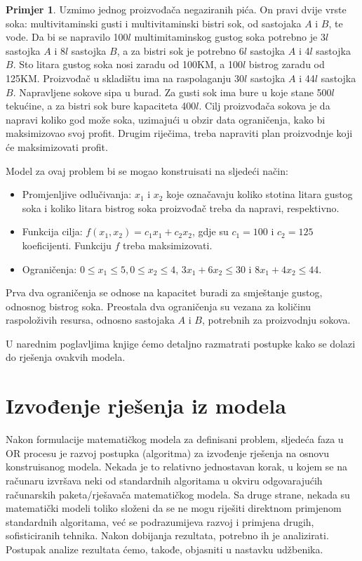 \documentclass[a4paper, utf8, 11pt, colorlinks]{book}
\theoremstyle{definition}
\newtheorem{primjer}{Primjer}[chapter]
\begin{document}
\begin{primjer}
Uzmimo jednog proizvođača negaziranih pića. On pravi dvije vrste soka: multivitaminski gusti i multivitaminski bistri sok, od sastojaka $A$ i $B$, te vode. Da bi se napravilo 100$l$ multimitaminskog gustog soka potrebno je 3$l$
sastojka $A$ i 8$l$ sastojka $B$, a za bistri sok je potrebno 6$l$ sastojka $A$ i 4$l$ sastojka $B$. Sto litara gustog soka nosi zaradu od 100KM, a 100$l$ bistrog zaradu od 125KM. Proizvođač u skladištu
ima na raspolaganju 30$l$ sastojka $A$ i 44$l$ sastojka $B.$ Napravljene sokove sipa u burad. Za
gusti sok ima bure u koje stane 500$l$ tekućine, a za bistri sok bure kapaciteta 400$l$.  Cilj proizvođača sokova je da napravi koliko god
može soka, uzimajući u obzir data ograničenja, kako bi maksimizovao svoj profit. Drugim
riječima, treba napraviti plan proizvodnje koji će maksimizovati profit.
	
\end{primjer}
Model za ovaj problem bi se mogao konstruisati na sljedeći način:
\begin{itemize}
    \item 
Promjenljive odlučivanja: $x_1$ i $x_2$ koje označavaju koliko stotina litara gustog soka i koliko litara bistrog soka proizvođač treba da napravi, respektivno.  
\item Funkcija cilja: $f(x_1, x_2) = c_1x_1 + c_2 x_2$, gdje su $c_1 = 100$ i  $c_2 = 125$ koeficijenti. Funkciju $f$ treba maksimizovati. 
\item Ograničenja: $0 \leq x_1 \leq 5, 0 \leq x_2 \leq 4$,   $3 x_1 + 6 x_2 \leq 30$ i $8 x_1 + 4 x_2 \leq 44.$
\end{itemize}
Prva dva ograničenja se odnose na kapacitet buradi za smještanje gustog, odnosnog bistrog soka. Preostala dva ograničenja su vezana za količinu raspoloživih resursa, odnosno sastojaka $A$ i $B$, potrebnih za proizvodnju sokova.

U narednim poglavljima knjige ćemo detaljno razmatrati postupke kako se dolazi do rješenja ovakvih modela.
 

\section{Izvođenje rješenja iz modela}

Nakon formulacije matematičkog modela za definisani problem, sljedeća faza u OR procesu  je razvoj postupka (algoritma) za
izvođenje rješenja na osnovu konstruisanog modela. Nekada je to relativno jednostavan korak, u kojem se na računaru izvršava neki od standardnih algoritama u okviru odgovarajućih računarskih paketa/rješavača matematičkog modela. Sa druge strane, nekada su matematički modeli toliko složeni da se ne mogu riješiti direktnom primjenom standardnih algoritama, već se podrazumijeva razvoj i primjena drugih, sofisticiranih tehnika.
Nakon dobijanja rezultata, potrebno ih je analizirati. Postupak analize rezultata ćemo, takođe, objasniti u nastavku udžbenika. 
\end{document}
